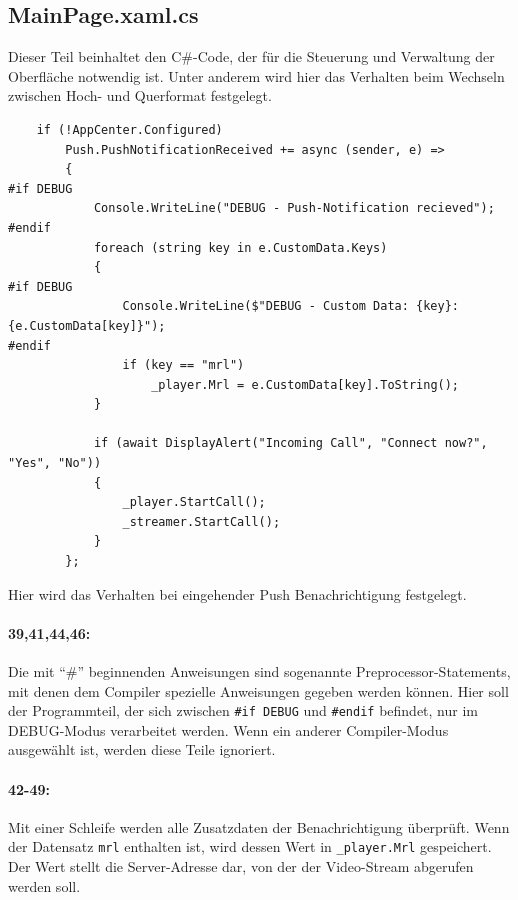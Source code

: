 \subsection{MainPage.xaml.cs}
\label{ssec:mainpage-xaml-cs}
Dieser Teil beinhaltet den C\#-Code, der für die Steuerung und Verwaltung der Oberfläche notwendig ist.
Unter anderem wird hier das Verhalten beim Wechseln zwischen Hoch- und Querformat festgelegt.
\begin{verbatim}
    if (!AppCenter.Configured)
        Push.PushNotificationReceived += async (sender, e) =>
        {
#if DEBUG
            Console.WriteLine("DEBUG - Push-Notification recieved");
#endif
            foreach (string key in e.CustomData.Keys)
            {
#if DEBUG
                Console.WriteLine($"DEBUG - Custom Data: {key}:{e.CustomData[key]}");
#endif
                if (key == "mrl")
                    _player.Mrl = e.CustomData[key].ToString();
            }

            if (await DisplayAlert("Incoming Call", "Connect now?", "Yes", "No"))
            {
                _player.StartCall();
                _streamer.StartCall();
            }
        };
\end{verbatim}
Hier wird das Verhalten bei eingehender Push Benachrichtigung festgelegt.
\paragraph{39,41,44,46:} Die mit \enquote{\#} beginnenden Anweisungen sind sogenannte Preprocessor-Statements, mit denen dem Compiler spezielle Anweisungen gegeben werden können.
Hier soll der Programmteil, der sich zwischen \texttt{\#if DEBUG} und \texttt{\#endif} befindet, nur im DEBUG-Modus verarbeitet werden.
Wenn ein anderer Compiler-Modus ausgewählt ist, werden diese Teile ignoriert.
\paragraph{42-49:} Mit einer Schleife werden alle Zusatzdaten der Benachrichtigung überprüft.
Wenn der Datensatz \texttt{mrl} enthalten ist, wird dessen Wert in \texttt{\_player.Mrl} gespeichert.
Der Wert stellt die Server-Adresse dar, von der der Video-Stream abgerufen werden soll.
